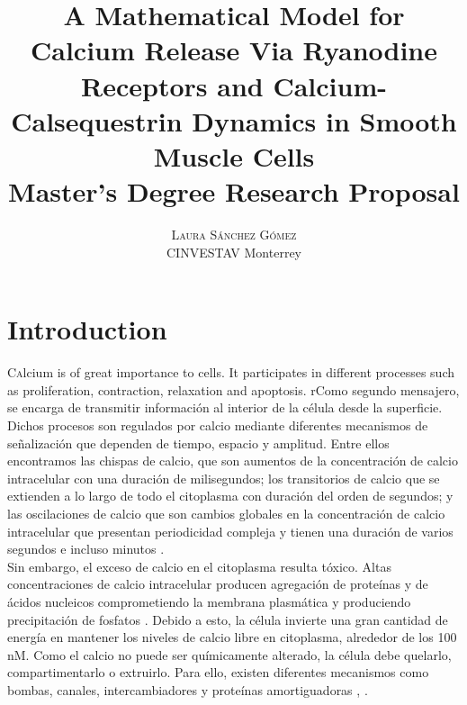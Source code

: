 \documentclass[draft]{article}
\title{A Mathematical Model for Calcium Release Via Ryanodine Receptors and Calcium-Calsequestrin Dynamics in Smooth Muscle Cells \\  \Large Master's Degree Research Proposal}
\author{%
\textsc{Laura Sánchez Gómez} \\ %
\normalsize CINVESTAV Monterrey \\ %
} %
\begin{document}
\maketitle


\section{Introduction}

\lettrine[nindent=0em,lines=3]{C}
alcium is of great importance to cells. It participates in different processes such as proliferation, contraction, relaxation and apoptosis. rComo segundo mensajero, se encarga de transmitir información al interior de la célula desde la superficie. Dichos procesos son regulados por calcio mediante diferentes mecanismos de señalización que dependen de tiempo, espacio y amplitud. Entre ellos encontramos las chispas de calcio, que son aumentos de la concentración de calcio intracelular con una duración de milisegundos; los transitorios de calcio que se extienden a lo largo de todo el citoplasma con duración del orden de segundos; y las oscilaciones de calcio que son cambios globales en la concentración de calcio intracelular que presentan periodicidad compleja y tienen una duración de varios segundos e incluso minutos \cite{Perez-Rosas2016}. \\

Sin embargo, el exceso de calcio en el citoplasma resulta tóxico. Altas concentraciones de calcio intracelular producen agregación de proteínas y de ácidos nucleicos comprometiendo la membrana plasmática y produciendo precipitación de fosfatos \cite{Perez-Rosas2016}. Debido a esto, la célula invierte una gran cantidad de energía en mantener los niveles de calcio libre en citoplasma, alrededor de los 100 nM. Como el calcio no puede ser químicamente alterado, la célula debe quelarlo, compartimentarlo o extruirlo. Para ello, existen diferentes mecanismos  como bombas, canales, intercambiadores y proteínas amortiguadoras \cite{Carafoli2003}, \cite{Clapham2007}. \\
\end{document}
